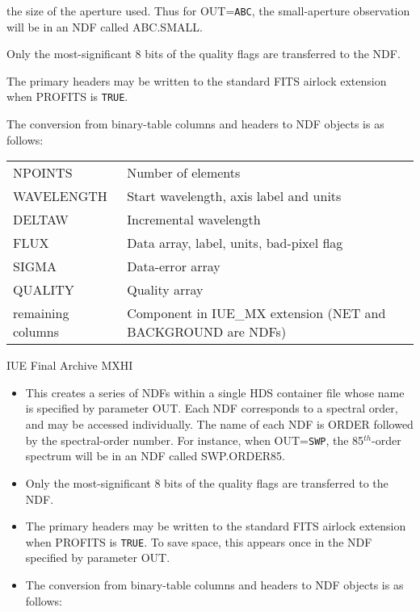 \documentclass[twoside,11pt]{article}
\newcommand{\ssthitemlist}[1]{
  \latexonly{
  \mbox{} \\
  \vspace{-3.5ex}
  }
  \begin{itemize}
     #1
  \end{itemize}
}
\newcommand{\sstitem}{\item}
\newcommand{\sstitem}{\item}
\begin{document}
{{{{            the size of the aperture used.  Thus for OUT=\texttt{ABC}, the
            small-aperture observation will be in an NDF called ABC.SMALL.
            \sstitem
            Only the most-significant 8 bits of the quality flags are
            transferred to the NDF.
            \sstitem
            The primary headers may be written to the standard FITS
            airlock extension when PROFITS is \texttt{TRUE}.
            \sstitem
            The conversion from binary-table columns and headers to NDF
            objects is as follows:
            \\[\medskipamount]
            \begin{tabular}{lp{90mm}}
            NPOINTS            &   Number of elements \\
            WAVELENGTH         &   Start wavelength, axis label and units \\
            DELTAW             &   Incremental wavelength \\
            FLUX               &   Data array, label, units, bad-pixel flag \\
            SIGMA              &   Data-error array \\
            QUALITY            &   Quality array \\
            remaining columns  &   Component in IUE\_MX extension (NET and
                                   BACKGROUND are NDFs) \\
            \end{tabular}
         }
         \bigskip
         \sstitem
         IUE Final Archive MXHI
         \ssthitemlist{
            \sstitem
            This creates a series of NDFs within a single HDS container
            file whose name is specified by parameter OUT.  Each NDF
            corresponds to a spectral order, and may be accessed individually.
            The name of each NDF is ORDER followed by the spectral-order
            number.  For instance, when OUT=\texttt{SWP}, the 85$^{th}$-order
            spectrum will be in an NDF called SWP.ORDER85.
            \sstitem
            Only the most-significant 8 bits of the quality flags are
            transferred to the NDF.
            \sstitem
            The primary headers may be written to the standard FITS
            airlock extension when PROFITS is \texttt{TRUE}.  To save space, this
            appears once in the NDF specified by parameter OUT.
            \sstitem
            The conversion from binary-table columns and headers to NDF
            objects is as follows:
}}}}
\end{document}
